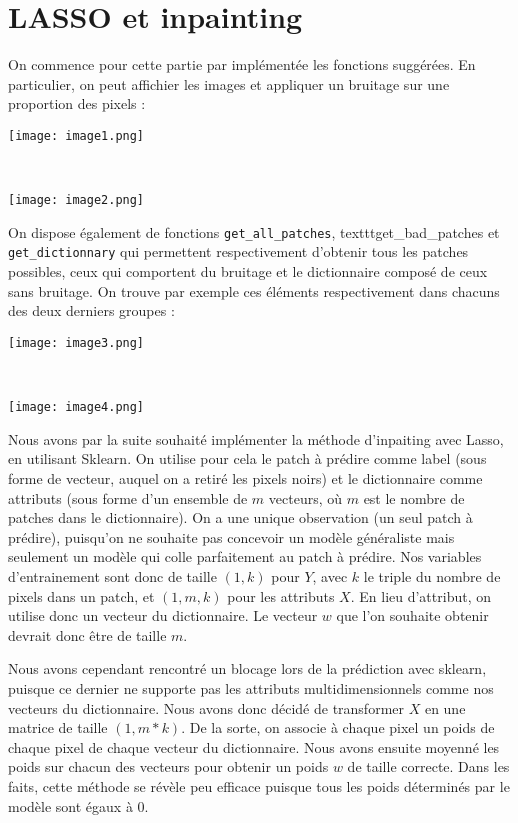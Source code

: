 \documentclass[a4paper, 10pt]{article}
\begin{document}
\section*{LASSO et inpainting}

On commence pour cette partie par implémentée les fonctions suggérées. En particulier, on peut affichier les images et appliquer un bruitage sur une proportion des pixels :

\begin{centering}
\texttt{[image: image1.png]}
\end{centering}
\\
\begin{centering}
\texttt{[image: image2.png]}
\end{centering}

On dispose également de fonctions \texttt{get\_all\_patches}, texttt{get\_bad\_patches} et \texttt{get\_dictionnary} qui permettent respectivement d'obtenir tous les patches possibles, ceux qui comportent du bruitage et le dictionnaire composé de ceux sans bruitage. On trouve par exemple ces éléments respectivement dans chacuns des deux derniers groupes : 

\begin{centering}
\texttt{[image: image3.png]}
\end{centering}
\\
\begin{centering}
\texttt{[image: image4.png]}
\end{centering}

Nous avons par la suite souhaité implémenter la méthode d'inpaiting avec Lasso, en utilisant Sklearn. On utilise pour cela le patch à prédire comme label (sous forme de vecteur, auquel on a retiré les pixels noirs) et le dictionnaire comme attributs (sous forme d'un ensemble de $m$ vecteurs, où $m$ est le nombre de patches dans le dictionnaire). On a une unique observation (un seul patch à prédire), puisqu'on ne souhaite pas concevoir un modèle généraliste mais seulement un modèle qui colle parfaitement au patch à prédire. Nos variables d'entrainement sont donc de taille $(1, k)$ pour $Y$, avec $k$ le triple du nombre de pixels dans un patch, et $(1, m, k)$ pour les attributs $X$. En lieu d'attribut, on utilise donc un vecteur du dictionnaire. Le vecteur $w$ que l'on souhaite obtenir devrait donc être de taille $m$.

Nous avons cependant rencontré un blocage lors de la prédiction avec sklearn, puisque ce dernier ne supporte pas les attributs multidimensionnels comme nos vecteurs du dictionnaire. Nous avons donc décidé de transformer $X$ en une matrice de taille $(1, m * k)$. De la sorte, on associe à chaque pixel un poids de chaque pixel de chaque vecteur du dictionnaire. Nous avons ensuite moyenné les poids sur chacun des vecteurs pour obtenir un poids $w$ de taille correcte. Dans les faits, cette méthode se révèle peu efficace puisque tous les poids déterminés par le modèle sont égaux à 0.
\end{document}
